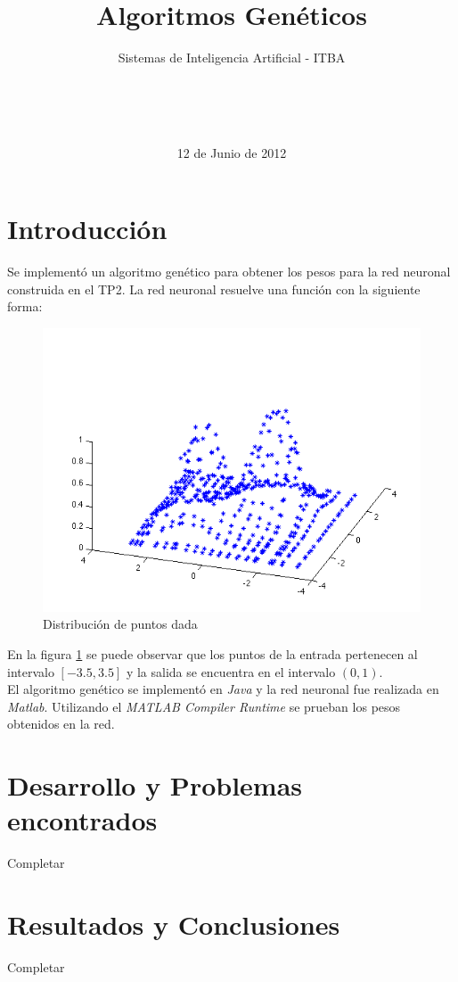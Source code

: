 \documentclass{sig-alternate}
\begin{document}

\title{Algoritmos Genéticos}
\subtitle{Sistemas de Inteligencia Artificial - ITBA}


\author{
	\\
	\\
	\\	
}

\date{12 de Junio de 2012}

\maketitle

\section*{Introducción}

	Se implementó un algoritmo genético para obtener los pesos para la red neuronal construida en el TP2.
	La red neuronal resuelve una función con la siguiente forma:

	\begin{figure}[!ht]
		\includegraphics[scale=0.5]{./figures/function.png}
  		\caption{Distribución de puntos dada}
  		\label{fig:function}
	\end{figure}

	En la figura \ref{fig:function} se puede observar que los puntos de la entrada pertenecen al intervalo $[-3.5, 3.5]$ y la salida se encuentra en el intervalo $(0, 1)$.\\
	El algoritmo genético se implementó en \textit{Java} y la red neuronal fue realizada en \textit{Matlab}.
	Utilizando el \textit{MATLAB Compiler Runtime} se prueban los pesos obtenidos en la red.

\section*{Desarrollo y Problemas encontrados}

Completar
	
\section*{Resultados y Conclusiones}

Completar
\end{document}
